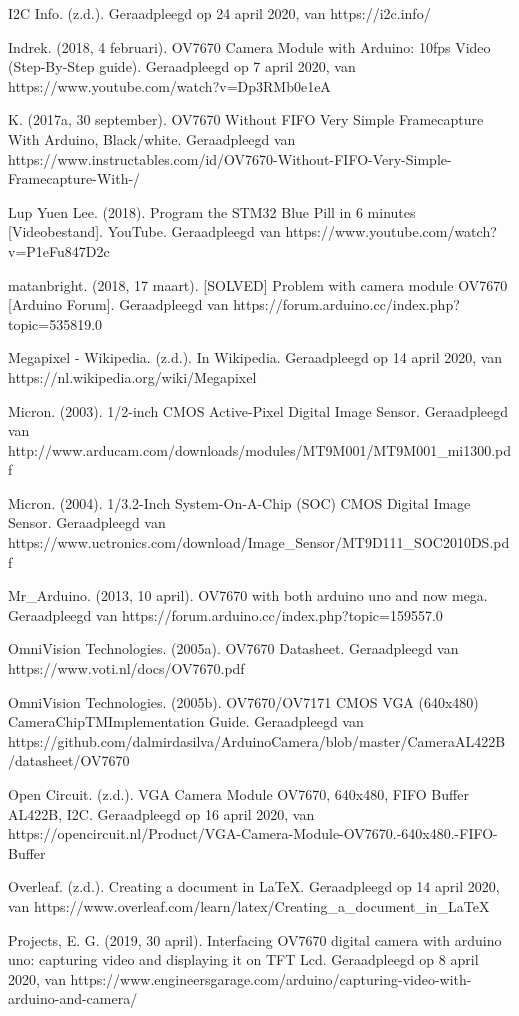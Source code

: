 \documentclass{article}
\begin{document}
I2C Info. (z.d.). Geraadpleegd op 24 april 2020, van https://i2c.info/

Indrek. (2018, 4 februari). OV7670 Camera Module with Arduino: 10fps Video (Step-By-Step guide). Geraadpleegd op 7 april 2020, van https://www.youtube.com/watch?v=Dp3RMb0e1eA

K. (2017a, 30 september). OV7670 Without FIFO Very Simple Framecapture With Arduino, Black/white. Geraadpleegd van https://www.instructables.com/id/OV7670-Without-FIFO-Very-Simple-Framecapture-With-/

Lup Yuen Lee. (2018). Program the STM32 Blue Pill in 6 minutes [Videobestand]. YouTube. Geraadpleegd van https://www.youtube.com/watch?v=P1eFu847D2c

matanbright. (2018, 17 maart). [SOLVED] Problem with camera module OV7670 [Arduino Forum]. Geraadpleegd van https://forum.arduino.cc/index.php?topic=535819.0

Megapixel - Wikipedia. (z.d.). In Wikipedia. Geraadpleegd op 14 april 2020, van https://nl.wikipedia.org/wiki/Megapixel

Micron. (2003). 1/2-inch CMOS Active-Pixel Digital Image Sensor. Geraadpleegd van http://www.arducam.com/downloads/modules/MT9M001/MT9M001_mi1300.pdf

Micron. (2004). 1/3.2-Inch System-On-A-Chip (SOC) CMOS Digital Image Sensor. Geraadpleegd van https://www.uctronics.com/download/Image_Sensor/MT9D111_SOC2010DS.pdf

Mr_Arduino. (2013, 10 april). OV7670 with both arduino uno and now mega. Geraadpleegd van https://forum.arduino.cc/index.php?topic=159557.0

OmniVision Technologies. (2005a). OV7670 Datasheet. Geraadpleegd van https://www.voti.nl/docs/OV7670.pdf

OmniVision Technologies. (2005b). OV7670/OV7171 CMOS VGA (640x480) CameraChipTMImplementation Guide. Geraadpleegd van https://github.com/dalmirdasilva/ArduinoCamera/blob/master/CameraAL422B/datasheet/OV7670%

Open Circuit. (z.d.). VGA Camera Module OV7670, 640x480, FIFO Buffer AL422B, I2C. Geraadpleegd op 16 april 2020, van https://opencircuit.nl/Product/VGA-Camera-Module-OV7670.-640x480.-FIFO-Buffer

Overleaf. (z.d.). Creating a document in LaTeX. Geraadpleegd op 14 april 2020, van https://www.overleaf.com/learn/latex/Creating_a_document_in_LaTeX

Projects, E. G. (2019, 30 april). Interfacing OV7670 digital camera with arduino uno: capturing video and displaying it on TFT Lcd. Geraadpleegd op 8 april 2020, van https://www.engineersgarage.com/arduino/capturing-video-with-arduino-and-camera/
\end{document}

